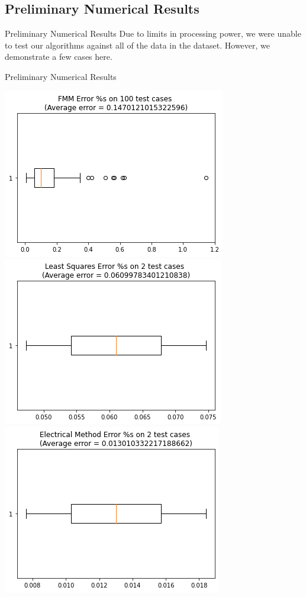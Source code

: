 \documentclass[aspectratio=169, bigfiles]{beamer}
\begin{document}
\subsection{Preliminary Numerical Results}

\begin{frame}{Preliminary Numerical Results}
    Due to limits in processing power, we were unable to test our algorithms against all of the data in the dataset. 
    However, we demonstrate a few cases here.
\end{frame}

\begin{frame}{Preliminary Numerical Results}

\includegraphics[scale=0.35]{Jupyter Notebook LaTeX/fmmerror.png}
\includegraphics[scale=0.35]{Jupyter Notebook LaTeX/leastsquareerror.png}
\includegraphics[scale=0.35]{Jupyter Notebook LaTeX/electricerror.png}

\end{frame}
\end{document}
